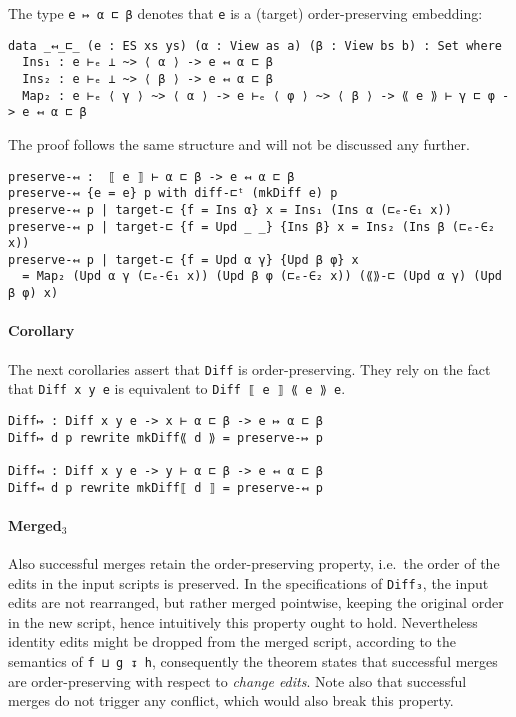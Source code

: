 \documentclass[../Thesis.tex]{subfiles}
\begin{document}
	The type \texttt{e ↦ α ⊏ β} denotes that \texttt{e} is a (target) 
	order-preserving embedding:

\begin{verbatim}
data _↤_⊏_ (e : ES xs ys) (α : View as a) (β : View bs b) : Set where
  Ins₁ : e ⊢ₑ ⊥ ~> ⟨ α ⟩ -> e ↤ α ⊏ β
  Ins₂ : e ⊢ₑ ⊥ ~> ⟨ β ⟩ -> e ↤ α ⊏ β
  Map₂ : e ⊢ₑ ⟨ γ ⟩ ~> ⟨ α ⟩ -> e ⊢ₑ ⟨ φ ⟩ ~> ⟨ β ⟩ -> ⟪ e ⟫ ⊢ γ ⊏ φ -> e ↤ α ⊏ β
\end{verbatim}
         
	The proof follows the same structure and will not be discussed any further.
\begin{verbatim}
preserve-↤ :  ⟦ e ⟧ ⊢ α ⊏ β -> e ↤ α ⊏ β 
preserve-↤ {e = e} p with diff-⊏ᵗ (mkDiff e) p
preserve-↤ p | target-⊏ {f = Ins α} x = Ins₁ (Ins α (⊏ₑ-∈₁ x))
preserve-↤ p | target-⊏ {f = Upd _ _} {Ins β} x = Ins₂ (Ins β (⊏ₑ-∈₂ x))
preserve-↤ p | target-⊏ {f = Upd α γ} {Upd β φ} x 
  = Map₂ (Upd α γ (⊏ₑ-∈₁ x)) (Upd β φ (⊏ₑ-∈₂ x)) (⟪⟫-⊏ (Upd α γ) (Upd β φ) x) 
\end{verbatim}
	
	\paragraph{Corollary}
	The next corollaries assert that \texttt{Diff} is order-preserving.
 	They rely on the fact that \texttt{Diff x y e} is equivalent to
	\texttt{Diff ⟦ e ⟧ ⟪ e ⟫ e}.

\begin{verbatim}
Diff↦ : Diff x y e -> x ⊢ α ⊏ β -> e ↦ α ⊏ β
Diff↦ d p rewrite mkDiff⟪ d ⟫ = preserve-↦ p

Diff↤ : Diff x y e -> y ⊢ α ⊏ β -> e ↤ α ⊏ β
Diff↤ d p rewrite mkDiff⟦ d ⟧ = preserve-↤ p
\end{verbatim}

	\paragraph{Merged$_3$}
	Also successful merges retain the order-preserving property, i.e.\
	the order of the edits in the input scripts is preserved.
	In the specifications of \texttt{Diff₃}, the input edits are not rearranged, 
	but rather merged pointwise, keeping the original order in the new script,
	hence intuitively this property ought to hold.
	Nevertheless identity edits might be dropped from the merged script, 
	according to the semantics of \texttt{f ⊔ g ↧ h},
	consequently the theorem states that successful merges are 
	order-preserving with respect to \emph{change edits}.
	Note also that successful merges do not trigger any conflict, which
	would also break this property.
	
\end{document}

